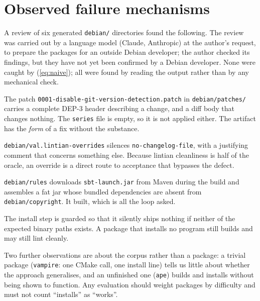 \documentclass[11pt]{article}
\newcommand{\pkg}[1]{\texttt{#1}}
\newcommand{\file}[1]{\texttt{#1}}
\begin{document}
\section{Observed failure mechanisms}

A review of six generated \file{debian/} directories found the following.
The review was carried out by a language model (Claude, Anthropic) at the
author's request, to prepare the packages for an outside Debian developer;
the author checked its findings, but they have not yet been confirmed by a
Debian developer. None were caught by (\ref{eq:naive}); all were found by
reading the output rather than by any mechanical check.

\begin{description}[style=nextline,leftmargin=1.5em]
\item[F1: The no-op patch (\pkg{souffle}).]
  The patch \file{0001-disable-git-version-detection.patch} in
  \file{debian/patches/} carries a
  complete DEP-3 header describing a change, and a diff body that changes
  nothing. The \file{series} file is empty, so it is not applied either. The
  artifact has the \emph{form} of a fix without the substance.
\item[F2: Suppression instead of repair (\pkg{val}).]
  \file{debian/val.lintian-overrides} silences \texttt{no-changelog-file},
  with a justifying comment that concerns something else. Because lintian
  cleanliness is half of the oracle, an override is a direct route to
  acceptance that bypasses the defect.
\item[F3: Network at build time, undeclared bundling (\pkg{leo-iii}).]
  \file{debian/rules} downloads \file{sbt-launch.jar} from Maven during the
  build and assembles a fat jar whose bundled dependencies are absent from
  \file{debian/copyright}. It built, which is all the loop asked.
\item[F4: The hollow install (\pkg{fast-downward}).]
  The install step is guarded so that it silently ships nothing if neither
  of the expected binary paths exists. A package that installs no program
  still builds and may still lint cleanly.
\end{description}

\noindent Two further observations are about the corpus rather than a
package: a trivial package (\pkg{vampire}: one CMake call, one install line)
tells us little about whether the approach generalises, and an unfinished
one (\pkg{ape}) builds and installs without being shown to function. Any
evaluation should weight packages by difficulty and must not count
``installs'' as ``works''.
\end{document}

